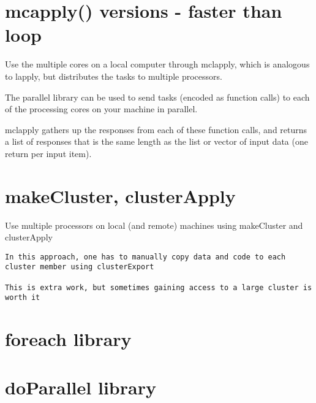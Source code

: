 \section{mcapply() versions - faster than loop}

Use the multiple cores on a local computer through mclapply,
which is analogous to lapply, but distributes the tasks to multiple processors.


The parallel library can be used to send tasks (encoded as function calls) to
each of the processing cores on your machine in parallel.

mclapply gathers up the responses from each of these function calls, and returns
a list of responses that is the same length as the list or vector of input data
(one return per input item).



\section{makeCluster, clusterApply}

Use multiple processors on local (and remote) machines using makeCluster and clusterApply

\begin{verbatim}
In this approach, one has to manually copy data and code to each cluster member using clusterExport

This is extra work, but sometimes gaining access to a large cluster is worth it

\end{verbatim}



\section{foreach library}


\section{doParallel library}



